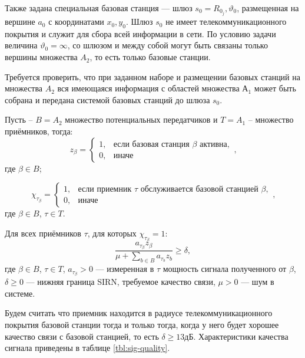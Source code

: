 Также задана специальная базовая станция --- шлюз $s_0 = {{R_0_j}, \vartheta_0}$, размещенная на вершине $a_0$ с координатами ${x_0, y_0}$. Шлюз $s_0$ не имеет телекоммуникационного покрытия и служит для сбора всей информации в сети. По условию задачи
величина $\vartheta_0 = \infty$, со шлюзом и между собой
могут быть связаны только вершины множества $A_2$, то есть только базовые станции.

Требуется проверить, что при заданном наборе и размещении базовых станций на множества $A_2$ вся имеющаяся информация с областей множества $А_1$ может быть собрана и передана системой базовых станций до шлюза $s_0$.

Пусть – $B = A_2$ множество потенциальных передатчиков и $T = A_1$ – множество 
приёмников, тогда:
\begin{equation}
	z_\beta = 
	\begin{cases}
		1,& \text{если базовая станция $\beta$ активна},\\
		0,& \text{иначе}
	\end{cases}\text{,}
\end{equation}
где $\beta \in B$;

\begin{equation}
	\chi_\tau_\beta = 
	\begin{cases}
		1,& \text{если приемник $\tau$ обслуживается базовой станцией $\beta$},\\
		0,& \text{иначе}
	\end{cases}\text{,}
\end{equation}
где $\beta \in B$, $\tau \in T$.

Для всех приёмников $\tau$, для которых $\chi_\tau_\beta = 1$:
\begin{equation}
	\frac{a_\tau_\beta z_\beta}{\mu + \sum_{b \in B}a_\tau_b z_b} \ge \delta, 
\end{equation}
где $\beta \in B$, $\tau \in T$, $a_\tau_\beta > 0$ --- измеренная в $\tau$ мощность сигнала полученного от $\beta$, $\delta \ge 0$ --- нижняя граница SIRN, требуемое качество связи, $\mu > 0$ --- шум в системе.

Будем считать что приемник находится в радиусе телекоммуникационного покрытия базовой станции тогда и только тогда, когда у него будет хорошее качество связи с базовой станцией, то 
есть $\delta \ge 13$дБ. Характеристики качества сигнала приведены в таблице \ref{tbl:sig-quality}.

